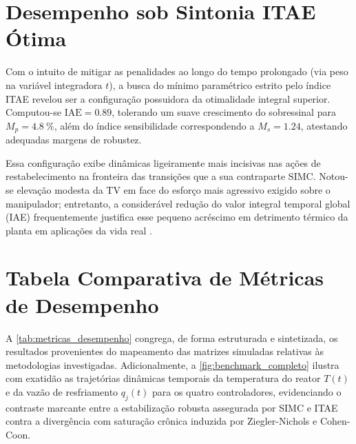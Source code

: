 \section{Desempenho sob Sintonia ITAE Ótima}
\label{sec:desempenho_itae}

Com o intuito de mitigar as penalidades ao longo do tempo prolongado (via peso na variável integradora $t$), a busca do mínimo paramétrico estrito pelo índice ITAE revelou ser a configuração possuidora da otimalidade integral superior. Computou-se $\text{IAE} = 0.89$, tolerando um suave crescimento do sobressinal para $M_p = \SI{4.8}{\percent}$, além do índice sensibilidade correspondendo a $M_s = 1.24$, atestando adequadas margens de robustez.

Essa configuração exibe dinâmicas ligeiramente mais incisivas nas ações de restabelecimento na fronteira das transições que a sua contraparte SIMC. Notou-se elevação modesta da TV em face do esforço mais agressivo exigido sobre o manipulador; entretanto, a considerável redução do valor integral temporal global (IAE) frequentemente justifica esse pequeno acréscimo em detrimento térmico da planta em aplicações da vida real \cite{Shinskey1996,Astrom2006}.

\section{Tabela Comparativa de Métricas de Desempenho}
\label{sec:tabela_metricas}

A \autoref{tab:metricas_desempenho} congrega, de forma estruturada e sintetizada, os resultados provenientes do mapeamento das matrizes simuladas relativas às metodologias investigadas. Adicionalmente, a \cref{fig:benchmark_completo} ilustra com exatidão as trajetórias dinâmicas temporais da temperatura do reator $T(t)$ e da vazão de resfriamento $q_j(t)$ para os quatro controladores, evidenciando o contraste marcante entre a estabilização robusta assegurada por SIMC e ITAE contra a divergência com saturação crônica induzida por Ziegler-Nichols e Cohen-Coon.



